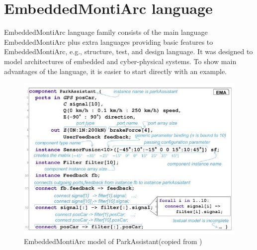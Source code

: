 \section{EmbeddedMontiArc language} \label{sec:ema}
EmbeddedMontiArc language family consists of the main language EmbeddedMontiArc plus extra languages providing basic features to EmbeddedMontiArc, e.g., structure, test, and design language. It was designed to model architectures of embedded and cyber-physical systems. To show main advantages of the language, it is easier to start directly with an example.
\begin{figure}[h!]
    \centering
    \includegraphics[width=\linewidth]{src/pic/embdmontiarc}
    \caption{EmbeddedMontiArc model of ParkAssistant(copied from \cite{Mon10})}
    \label{fig:embdmontiarc}
\end{figure}
